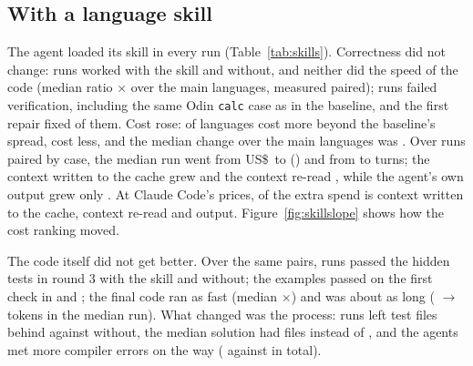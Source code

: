 \documentclass[11pt,a4paper]{article}
\begin{document}
\begin{table}[h]
\centering\small
\caption{Specialised tracks. US\$ is the sum of the per-task medians over the track's two tasks, so it is
comparable within a track, not with Table~\ref{tab:main}.}
\label{tab:tracks}
\TrackTable
\end{table}

\begin{table}[h]
\centering\small
\caption{Front end. Ratios to Svelte (= 1): the article~\cite{tokenomics1} and our measurement.}
\label{tab:front}
\FrontTable
\end{table}

\subsection{With a language skill}

The agent loaded its skill in every run (Table~\ref{tab:skills}). Correctness did not change:
\SkillWorksArm{} runs worked with the skill and \SkillWorksBase{} without, and neither did the speed of the
code (median ratio \SkillSpeedMedian$\times$ over the main languages, measured paired); \NSkillFailed{} runs failed
verification, including the same Odin \texttt{calc} case as in the baseline, and the first repair fixed
\NSkillFixed{} of them. Cost rose: \NSkillCostlier{} of \NSkillLangs{} languages cost more beyond the
baseline's spread, \NSkillCheaper{} cost less, and the median change over the main languages was
\SkillMedianChange. Over \NSkillPairs{} runs paired by case, the median run went from
US\$\,\SkillRunCostBase{} to \SkillRunCostArm{} (\SkillRunCostPct) and from \SkillTurnsBase{} to
\SkillTurnsArm{} turns; the context written to the cache grew \SkillCacheWritePct{} and the context
re-read \SkillCacheReadPct, while the agent's own output grew only \SkillOutputPct. At Claude Code's
prices, \SkillShareWrite{} of the extra spend is context written to the cache, \SkillShareRead{} context
re-read and \SkillShareOutput{} output.
Figure~\ref{fig:skillslope} shows how the cost ranking moved.

The code itself did not get better. Over the same pairs, \SkillCodeSolvedArm{} runs passed the hidden
tests in round 3 with the skill and \SkillCodeSolvedBase{} without; the examples passed on the first check
in \SkillCodeFirstArm{} and \SkillCodeFirstBase; the final code ran as fast (median
\SkillSpeedMedian$\times$) and was about as long (\SkillCodeTokBase{} $\to$ \SkillCodeTokArm{} tokens in the
median run). What changed was the process: \SkillCodeTestsArm{} runs left test files behind against
\SkillCodeTestsBase{} without, the median solution had \SkillCodeFilesArm{} files instead of
\SkillCodeFilesBase, and the agents met more compiler errors on the way (\SkillCodeErrArm{} against
\SkillCodeErrBase{} in total).
\end{document}
